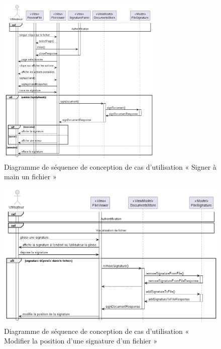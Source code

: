 \begin{figure}[H]
  \centering
  \includegraphics[width=0.7\textwidth]{out/diagrams/sprint4/sequence_sign_by_hand/sequence_sign_by_hand}
  \caption{Diagramme de séquence de conception de cas d'utilisation « Signer à main un fichier »}
  \label{fig:sequence_conception_sign_by_hand}
\end{figure}

\begin{figure}[H]
  \centering
  \includegraphics[width=1\textwidth]{out/diagrams/sprint4/sequence_move_signature/sequence_move_signature}
  \caption{Diagramme de séquence de conception de cas d'utilisation « Modifier la position d'une signature d'un fichier »}
  \label{fig:sequence_conception_move_signature}
\end{figure}

